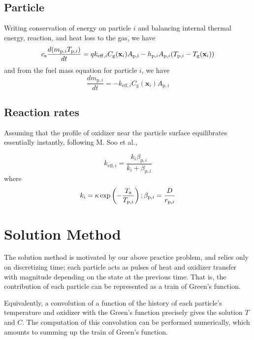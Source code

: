 \documentclass{article}
\begin{document}
\subsection{Particle}

Writing conservation of energy on particle $i$ and balancing internal thermal energy, reaction, and heat loss to the gas, we have
\begin{equation}
    c_\mathrm{s} \frac{d(m_{\mathrm{p},i} T_{\mathrm{p},i})}{dt} = q k_{\mathrm{eff},i} C_\mathrm{g} (\mathbf{x}_i) A_\mathrm{p,i} - h_{\mathrm{p},i} A_{\mathrm{p},i} (T_{\mathrm{p},i} - T_\mathrm{g}(\mathbf{x}_i))
\end{equation}
and from the fuel mass equation for particle $i$, we have
\begin{equation}
    \frac{d m_{\mathrm{p},i}}{dt} = -k_{\mathrm{eff},i} C_\mathrm{g} (\mathbf{x}_i) A_{\mathrm{p},i}
\end{equation}

\subsection{Reaction rates}

Assuming that the profile of oxidizer near the particle surface equilibrates essentially instantly, following M. Soo et al.,

\begin{equation}
    k_{\mathrm{eff},i} = \frac{k_i \beta_{\mathrm{p},i}}{k_i + \beta_{\mathrm{p},i}}
\end{equation}
where
\begin{equation}
    k_i = \kappa \exp\left( -\frac{T_\mathrm{a}}{T_{\mathrm{p},i}} \right); \beta_{\mathrm{p},i} = \frac{D}{r_{\mathrm{p},i}}
\end{equation}

\section{Solution Method}

The solution method is motivated by our above practice problem, and relies only on discretizing time; each particle acts as pulses of heat and oxidizer transfer with magnitude depending on the state at the previous time. That is, the contribution of each particle can be represented as a train of Green's function.

Equivalently, a convolution of a function of the history of each particle's temperature and oxidizer with the Green's function precisely gives the solution $T$ and $C$. The computation of this convolution can be performed numerically, which amounts to summing up the train of Green's function.
\end{document}
